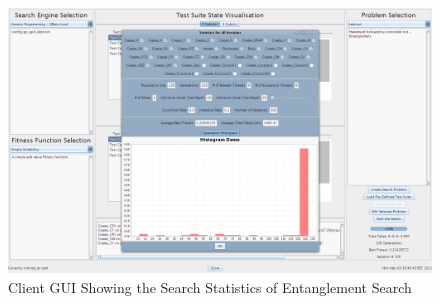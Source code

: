 \begin{figure}
  \includegraphics[width=\textwidth]{walkthrough11.png}
 \caption{Client GUI Showing the Search Statistics of Entanglement Search}
 \label{fig:walkthrough11}
\end{figure}
